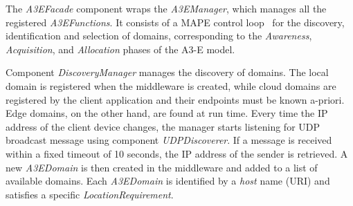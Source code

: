 
The \textit{A3EFacade} component wraps the \textit{A3EManager}, which manages all the registered \textit{A3EFunctions}. It consists of a MAPE control loop~\cite{kephart2003vision} for the discovery, identification and selection of domains, corresponding to the \textit{Awareness}, \textit{Acquisition}, and \textit{Allocation} phases of the A3-E model. 


Component \textit{DiscoveryManager} manages the discovery of domains. The local domain is registered when the middleware is created, while cloud domains are registered by the client application and their endpoints must be known a-priori. Edge domains, on the other hand, are found at run time. Every time the IP address of the client device changes, the manager starts listening for UDP broadcast message using component \textit{UDPDiscoverer}. If a message is received within a fixed timeout of 10 seconds, the IP address of the sender is retrieved. A new \textit{A3EDomain} is then created in the middleware and added to a list of available domains. Each \textit{A3EDomain} is identified by a \textit{host} name (URI) and satisfies a specific \textit{LocationRequirement}. 



